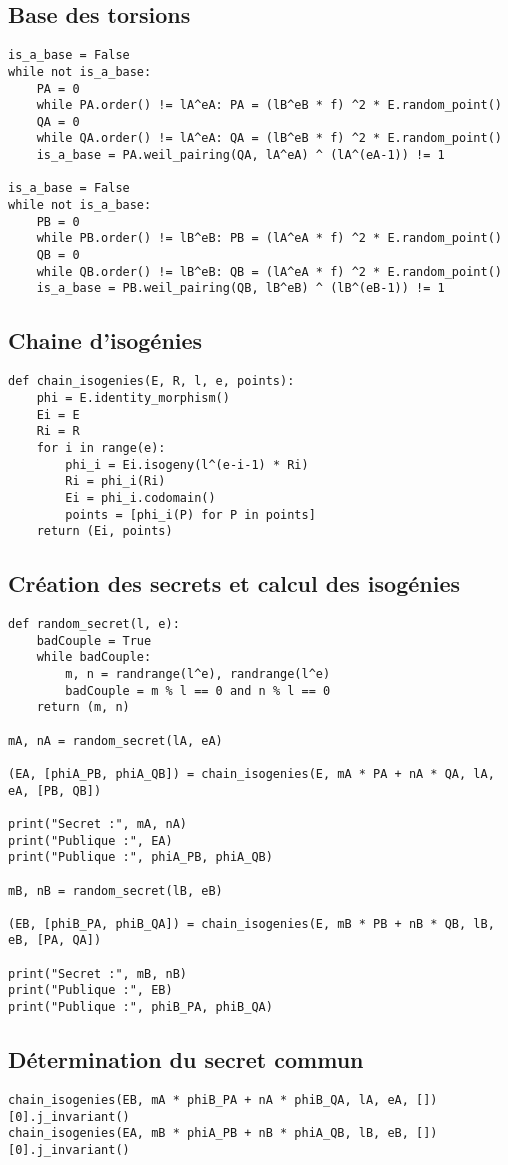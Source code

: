 \documentclass{article}
\theoremstyle{plain}%
\theoremstyle{definition}%
\begin{document}
\subsection*{Base des torsions}
\begin{verbatim}
is_a_base = False
while not is_a_base:
    PA = 0
    while PA.order() != lA^eA: PA = (lB^eB * f) ^2 * E.random_point()
    QA = 0
    while QA.order() != lA^eA: QA = (lB^eB * f) ^2 * E.random_point()
    is_a_base = PA.weil_pairing(QA, lA^eA) ^ (lA^(eA-1)) != 1

is_a_base = False
while not is_a_base:
    PB = 0
    while PB.order() != lB^eB: PB = (lA^eA * f) ^2 * E.random_point()
    QB = 0
    while QB.order() != lB^eB: QB = (lA^eA * f) ^2 * E.random_point()
    is_a_base = PB.weil_pairing(QB, lB^eB) ^ (lB^(eB-1)) != 1
\end{verbatim}


\subsection*{Chaine d'isogénies}
\begin{verbatim}
def chain_isogenies(E, R, l, e, points):
    phi = E.identity_morphism()
    Ei = E
    Ri = R
    for i in range(e):
        phi_i = Ei.isogeny(l^(e-i-1) * Ri)
        Ri = phi_i(Ri)
        Ei = phi_i.codomain()
        points = [phi_i(P) for P in points]
    return (Ei, points)
\end{verbatim}


\subsection*{Création des secrets et calcul des isogénies}
\begin{verbatim}
def random_secret(l, e):
    badCouple = True
    while badCouple:
        m, n = randrange(l^e), randrange(l^e)
        badCouple = m % l == 0 and n % l == 0
    return (m, n)

mA, nA = random_secret(lA, eA)

(EA, [phiA_PB, phiA_QB]) = chain_isogenies(E, mA * PA + nA * QA, lA, eA, [PB, QB])

print("Secret :", mA, nA)
print("Publique :", EA)
print("Publique :", phiA_PB, phiA_QB)

mB, nB = random_secret(lB, eB)

(EB, [phiB_PA, phiB_QA]) = chain_isogenies(E, mB * PB + nB * QB, lB, eB, [PA, QA])

print("Secret :", mB, nB)
print("Publique :", EB)
print("Publique :", phiB_PA, phiB_QA)
\end{verbatim}


\subsection*{Détermination du secret commun}
\begin{verbatim}
chain_isogenies(EB, mA * phiB_PA + nA * phiB_QA, lA, eA, [])[0].j_invariant()
chain_isogenies(EA, mB * phiA_PB + nB * phiA_QB, lB, eB, [])[0].j_invariant()
\end{verbatim}
\end{document}
